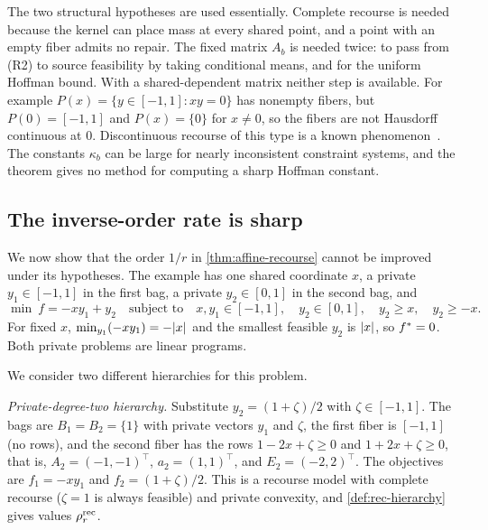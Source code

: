 The two structural hypotheses are used essentially. Complete recourse is
needed because the kernel can place mass at every shared point, and a
point with an empty fiber admits no repair. The fixed matrix $A_b$ is
needed twice: to pass from (R2) to source feasibility by taking
conditional means, and for the uniform Hoffman bound. With a
shared-dependent matrix neither step is available. For example
$P(x)=\{y\in[-1,1]:xy=0\}$ has nonempty fibers, but $P(0)=[-1,1]$ and
$P(x)=\{0\}$ for $x\ne0$, so the fibers are not Hausdorff continuous at $0$.
Discontinuous recourse of this type is a known
phenomenon~\cite{zhong2024-two-stage-polynomial}. The constants $\kappa_b$ can
be large for nearly inconsistent constraint systems, and the theorem gives
no method for computing a sharp Hoffman constant.

\subsection{The inverse-order rate is sharp}\label{sec:rec-sharp}

We now show that the order $1/r$ in \cref{thm:affine-recourse} cannot be
improved under its hypotheses. The example has one shared coordinate $x$,
a private $y_1\in[-1,1]$ in the first bag, a private $y_2\in[0,1]$ in the
second bag, and
\begin{equation}\label{eq:rec-sharp-problem}
  \min\ f=-xy_1+y_2\quad\text{subject to}\quad
  x,y_1\in[-1,1],\quad y_2\in[0,1],\quad y_2\ge x,\quad y_2\ge-x .
\end{equation}
For fixed $x$, $\min_{y_1}(-xy_1)=-\lvert x\rvert$ and the smallest feasible $y_2$
is $\lvert x\rvert$, so $f^{*}=0$. Both private problems are linear programs.

We consider two different hierarchies for this problem.

\emph{Private-degree-two hierarchy.} Substitute $y_2=(1+\zeta)/2$ with
$\zeta\in[-1,1]$. The bags are $B_1=B_2=\{1\}$ with private vectors $y_1$ and
$\zeta$, the first fiber is $[-1,1]$ (no rows), and the second fiber has
the rows $1-2x+\zeta\ge0$ and $1+2x+\zeta\ge0$, that is, $A_2=(-1,-1)^\top$,
$a_2=(1,1)^\top$, and $E_2=(-2,2)^\top$. The objectives are $f_1=-xy_1$ and
$f_2=(1+\zeta)/2$. This is a recourse model with complete recourse ($\zeta=1$
is always feasible) and private convexity, and \cref{def:rec-hierarchy}
gives values $\rho^{\mathrm{rec}}_r$.

